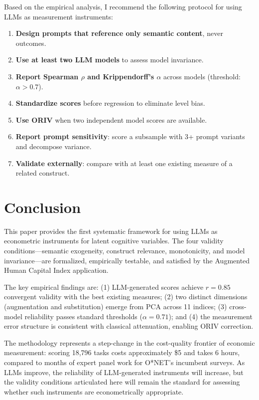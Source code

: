 \documentclass[11pt,a4paper]{article}
\theoremstyle{definition}
\begin{document}
Based on the empirical analysis, I recommend the following protocol for using LLMs as measurement instruments:

\begin{enumerate}[leftmargin=*]
\item \textbf{Design prompts that reference only semantic content}, never outcomes.
\item \textbf{Use at least two LLM models} to assess model invariance.
\item \textbf{Report Spearman $\rho$ and Krippendorff's $\alpha$} across models (threshold: $\alpha > 0.7$).
\item \textbf{Standardize scores} before regression to eliminate level bias.
\item \textbf{Use ORIV} when two independent model scores are available.
\item \textbf{Report prompt sensitivity}: score a subsample with 3+ prompt variants and decompose variance.
\item \textbf{Validate externally}: compare with at least one existing measure of a related construct.
\end{enumerate}


\section{Conclusion}
\label{sec:conclusion}

This paper provides the first systematic framework for using LLMs as econometric instruments for latent cognitive variables. The four validity conditions---semantic exogeneity, construct relevance, monotonicity, and model invariance---are formalized, empirically testable, and satisfied by the Augmented Human Capital Index application.

The key empirical findings are: (1) LLM-generated scores achieve $r = 0.85$ convergent validity with the best existing measures; (2) two distinct dimensions (augmentation and substitution) emerge from PCA across 11 indices; (3) cross-model reliability passes standard thresholds ($\alpha = 0.71$); and (4) the measurement error structure is consistent with classical attenuation, enabling ORIV correction.

The methodology represents a step-change in the cost-quality frontier of economic measurement: scoring 18,796 tasks costs approximately \$5 and takes 6 hours, compared to months of expert panel work for O*NET's incumbent surveys. As LLMs improve, the reliability of LLM-generated instruments will increase, but the validity conditions articulated here will remain the standard for assessing whether such instruments are econometrically appropriate.




\end{document}
